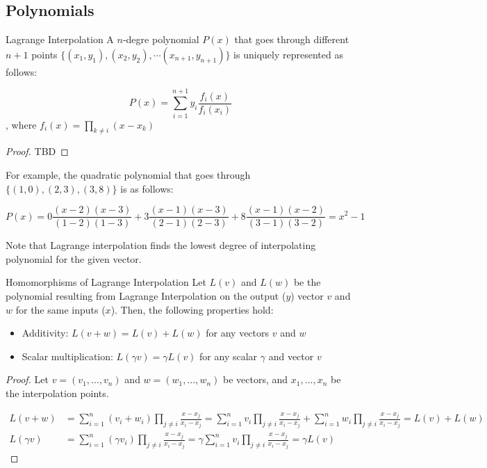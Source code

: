 \documentclass{article}
\begin{document}
\subsection{Polynomials}

\begin{theorem}{Lagrange Interpolation}{}
    A $n$-degre polynomial $P(x)$ that goes through different $n + 1$ points $\{(x_1, y_1), (x_2, y_2), \cdots (x_{n + 1}, y_{n + 1})\}$ is uniquely represented as follows:

    \begin{equation}
        P(x) = \sum^{n+1}_{i=1} y_i \frac{f_i(x)}{f_i(x_i)}
    \end{equation}, where $f_i(x) = \prod_{k \neq i} (x - x_k)$
\end{theorem}

\begin{proof}
    TBD
\end{proof}

For example, the quadratic polynomial that goes through $\{(1, 0), (2, 3), (3, 8)\}$ is as follows:

\begin{equation*}
    P(x) = 0 \frac{(x - 2)(x - 3)}{(1 - 2) (1 - 3)} + 3 \frac{(x - 1)(x - 3)}{(2 - 1) (2 - 3)} + 8 \frac{(x - 1)(x - 2)}{(3 - 1) (3 - 2)} = x^{2} - 1
\end{equation*}

Note that Lagrange interpolation finds the lowest degree of interpolating polynomial for the given vector.

\begin{proposition}{Homomorphisms of Lagrange Interpolation}{}
Let $L(v)$ and $L(w)$ be the polynomial resulting from Lagrange Interpolation on the output ($y$) vector $v$ and $w$ for the same inputs ($x$). Then, the following properties hold:

\begin{itemize}
    \item Additivity: $L(v + w) = L(v) + L(w)$ for any vectors $v$ and $w$
    \item Scalar multiplication: $L(\gamma v) = \gamma L(v)$ for any scalar $\gamma$ and vector $v$
\end{itemize}
\end{proposition}

\begin{proof}
    
Let $v = (v_1, \ldots, v_n)$ and $w = (w_1, \ldots, w_n)$ be vectors, and $x_1, \ldots, x_n$ be the interpolation points.

\begin{align*}
    L(v + w) &= \sum_{i=1}^n (v_i + w_i) \prod_{j \neq i} \frac{x - x_j}{x_i - x_j} = \sum_{i=1}^n v_i \prod_{j \neq i} \frac{x - x_j}{x_i - x_j} + \sum_{i=1}^n w_i \prod_{j \neq i} \frac{x - x_j}{x_i - x_j} = L(v) + L(w) \\
    L(\gamma v) &= \sum_{i=1}^n (\gamma v_i) \prod_{j \neq i} \frac{x - x_j}{x_i - x_j} = \gamma \sum_{i=1}^n v_i \prod_{j \neq i} \frac{x - x_j}{x_i - x_j} = \gamma L(v)
\end{align*}
\end{proof}
\end{document}
